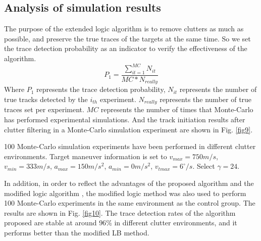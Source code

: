 \documentclass[default,iicol]{sn-jnl}%
\theoremstyle{thmstyleone}%
\theoremstyle{thmstyletwo}%
\theoremstyle{thmstylethree}%
\begin{document}
\subsection{Analysis of simulation results}\label{subsec6}

The purpose of the extended logic algorithm is to remove clutters as much as possible, and preserve the true traces of the targets at the same time. So we set the trace detection probability as an indicator to verify the effectiveness of the algorithm.
\begin{equation}\label{eq17}
    P _ { 1 } = \frac { \sum _ { i t = 1 } ^ { M C } N _ { i t } } { M C * N _ { r e a l l y } }
\end{equation}
Where $P_{1}$ represents the trace detection probability, $N_{it}$ represents the number of true tracks detected by the $i_{th}$ experiment. $N_{really}$ represents the number of true traces set per experiment. $M C$ represents the number of times that Monte-Carlo has performed experimental simulations. And the track initiation results after clutter filtering in a Monte-Carlo simulation experiment are shown in Fig. \ref{fig9}.

100 Monte-Carlo simulation experiments have been performed in different clutter environments. Target maneuver information is set to $v_{max}\!=\!750m/s$, $v_{min}\!=\!333m/s$, $a_{max}\!=\!150m/s^2$, $a_{min}\!=\!0m/s^2$, $v_{tmax}\!=\!6 ^ {\circ}/s$. Select $\gamma\!=\!24$.

In addition, in order to reflect the advantages of the proposed algorithm and the modified logic algorithm \cite{bib21}, the modified logic method was also used to perform 100 Monte-Carlo experiments in the same environment as the control group. The results are shown in Fig. \ref{fig10}. The trace detection rates of the algorithm proposed are stable at around $96 \%$ in different clutter environments, and it performs better than the modified LB method.
\end{document}
